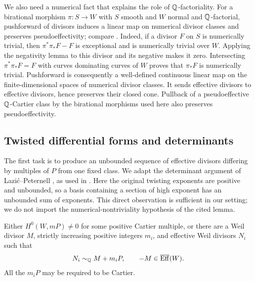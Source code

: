 We also need a numerical fact that explains the role of $\mathbb Q$-factoriality. For a birational morphism $\pi:S\to W$ with $S$ smooth and $W$ normal and $\mathbb Q$-factorial, pushforward of divisors induces a linear map on numerical divisor classes and preserves pseudoeffectivity; compare \cite[Lemma~3.4]{LMPTX2023}. Indeed, if a divisor $F$ on $S$ is numerically trivial, then $\pi^*\pi_*F-F$ is exceptional and is numerically trivial over $W$. Applying the negativity lemma to this divisor and its negative makes it zero. Intersecting $\pi^*\pi_*F=F$ with curves dominating curves of $W$ proves that $\pi_*F$ is numerically trivial. Pushforward is consequently a well-defined continuous linear map on the finite-dimensional spaces of numerical divisor classes. It sends effective divisors to effective divisors, hence preserves their closed cone. Pullback of a pseudoeffective $\mathbb Q$-Cartier class by the birational morphisms used here also preserves pseudoeffectivity.

\subsection{Twisted differential forms and determinants}\label{subsec:determinant}

The first task is to produce an unbounded sequence of effective divisors differing by multiples of $P$ from one fixed class. We adapt the determinant argument of Lazi\'c--Peternell \cite[Lemma~4.1]{LP2018}, as used in \cite[Lemma~5.1]{LMPTX2023}. Here the original twisting exponents are positive and unbounded, so a basis containing a section of high exponent has an unbounded sum of exponents. This direct observation is sufficient in our setting; we do not import the numerical-nontriviality hypothesis of the cited lemma.

\begin{lemma}\label{lem:determinant}
Either $H^0(W,mP)\ne0$ for some positive Cartier multiple, or there are a Weil divisor $M$, strictly increasing positive integers $m_i$, and effective Weil divisors $N_i$ such that
\begin{equation}\label{eq:Ni}
N_i\sim_{\mathbb Q} M+m_iP,\qquad -M\in\overline{\operatorname{Eff}}(W).
\end{equation}
All the $m_iP$ may be required to be Cartier.
\end{lemma}

